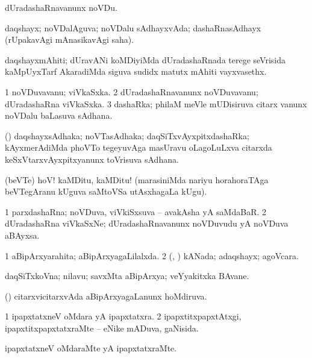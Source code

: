 \noindent 	 
\gl{\akirx}
\expl{}
\bmng
 dUradashaRnavanunx noVDu. 
\emng
\eentry

\bentry
{} 
\gl{\gu}
\expl{}
\bmng
 daqshayx; noVDalAguva; noVDalu sAdhayxvAda; dashaRnasAdhayx (rUpakavAgi mAnasikavAgi saha). 
\emng
\eentry

\bentry
{} 
\gl{\nA}
\expl{}
\bmng
 daqshayxmAhiti; dUravANi koMDiyiMda dUradashaRnada terege seVrisida kaMpUyxTarf AkaradiMda siguva sudidx matutx mAhiti vayxvasethx. 
\emng
\eentry

\bentry
{} 
\gl{\nA}
\expl{}
\bmng
\bnum
\num{1} noVDuvavanu; viVkaSxka. 
\num{2} dUradashaRnavanunx noVDuvavanu; dUradashaRna viVkaSxka. 
\num{3} dashaRka; philaM meVle mUDisiruva citarx \mo vanunx noVDalu baLasuva sAdhana. 
\enum
\emng
\eentry

\bentry
{} 
\gl{\nA}
\expl{}
\bmng
 (\CA) daqshayxsAdhaka; noVTasAdhaka; daqSiTxvAyxpitxdashaRka; kAyxmerAdiMda phoVTo tegeyuvAga masUravu oLagoLuLxva citarxda keSxVtarxvAyxpitxyanunx toVrisuva sAdhana. 
\emng
\eentry

\bentry
{}
\gl{\nA}
\expl{}
\bmng
 (beVTe) hoV! kaMDitu, kaMDitu! (marasiniMda nariyu horahoraTAga beVTegAranu kUguva saMtoVSa utAsxhagaLa kUgu). 
\emng
\eentry

\bentry
{} 
\gl{\nA}
\expl{}
\bmng
\bnum
\num{1} parxdashaRna; noVDuva, viVkiSxsuva -- avakAsha yA saMdaBaR. 
\num{2} dUradashaRna viVkaSxNe; dUradashaRnavanunx noVDuvudu yA noVDuva aBAyxsa. 
\enum
\emng
\eentry

\bentry
{} 
\gl{\gu}
\expl{}
\bmng
\bnum
\num{1} aBipArxyarahita; aBipArxyagaLilalxda. 
\num{2} (\kAparx, \alaMshA) kANada; adaqshayx; agoVcara. 
\enum
\emng
\eentry

\bentry
{} 
\gl{\nA}
\expl{}
\bmng
 daqSiTxkoVna; nilavu; savxMta aBipArxya; veYyakitxka BAvane. 
\emng
\eentry

\bentry
{} 
\gl{\gu}
\expl{}
\bmng
 (\AmA) citarxvicitarxvAda aBipArxyagaLanunx hoMdiruva. 
\emng
\eentry

\bentry
{} 
\gl{\gu}
\expl{}
\bmng
\bnum
\num{1} ipapxtatxneV oMdara yA ipapxtatxra. 
\num{2} ipapxtitxpapxtAtxgi, ipapxtitxpapxtatxraMte -- eNike mADuva, gaNisida. 
\enum
\emng
\eentry

\bentry
{} 
\gl{\kirxvi}
\expl{}
\bmng
 ipapxtatxneV oMdaraMte yA ipapxtatxraMte. 
\emng
\eentry

